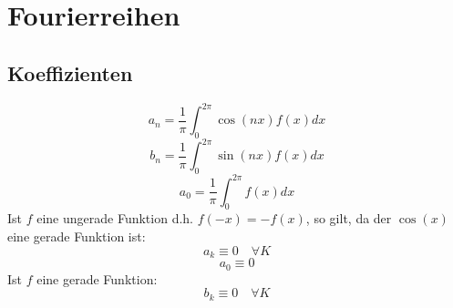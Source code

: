 \section{Fourierreihen}
\subsection{Koeffizienten}
\[ \boxed{a_n = \frac{1}{\pi} \int_0^{2 \pi} \cos(nx) f(x) dx} \]
\[ \boxed{b_n = \frac{1}{\pi} \int_0^{2 \pi} \sin(nx) f(x) dx} \]
\[ \boxed{a_0 = \frac{1}{\pi} \int_0^{2 \pi} f(x) dx
} \]
Ist $f$ eine ungerade Funktion d.h. $f(-x) = -f(x)$, so gilt, da der $\cos(x)$ eine gerade Funktion ist: 
\[ a_k \equiv 0 \quad \forall K\]
\[ a_0 \equiv 0 \]
Ist $f$ eine gerade Funktion: 
\[ b_k \equiv 0 \quad \forall K \]